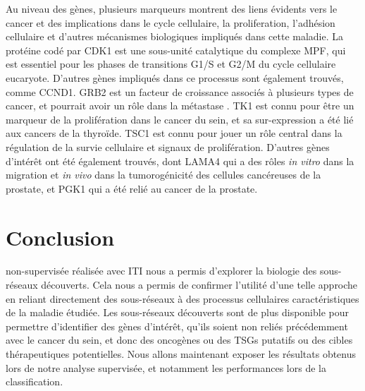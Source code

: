 		Au niveau des gènes, plusieurs marqueurs montrent des liens évidents vers le cancer et des implications dans le cycle cellulaire, la proliferation, l'adhésion cellulaire et d'autres mécanismes biologiques impliqués dans cette maladie.
		La protéine codé par \acs{CDK1} est une sous-unité catalytique du complexe \acs{MPF}, qui est essentiel pour les phases de transitions G1/S et G2/M du cycle cellulaire eucaryote.
		D'autres gènes impliqués dans ce processus sont également trouvés, comme \acs{CCND1}.
		\acs{GRB2} est un facteur de croissance associés à plusieurs types de cancer, et pourrait avoir un rôle dans la métastase \citet{Yu2008}.
		\acs{TK1} est connu pour être un marqueur de la prolifération dans le cancer du sein, et sa sur-expression a été lié aux cancers de la thyroïde.
		\acs{TSC1} est connu pour jouer un rôle central dans la régulation de la survie cellulaire et signaux de prolifération.
		D'autres gènes d'intérêt ont été également trouvés, dont \acs{LAMA4} qui a des rôles \emph{in vitro} dans la migration et \emph{in vivo} dans la tumorogénicité des cellules cancéreuses de la prostate, et \acs{PGK1} qui a été relié au cancer de la prostate.

\pagebreak

	\section{\textcolor{green!45!black}{{Conclusion}}}
		 non-supervisée réalisée avec ITI nous a permis d'explorer la biologie des sous-réseaux découverts.
		Cela nous a permis de confirmer l'utilité d'une telle approche en reliant directement des sous-réseaux à des processus cellulaires caractéristiques de la maladie étudiée.
		Les sous-réseaux découverts sont de plus disponible pour permettre d'identifier des gènes d'intérêt, qu'ils soient non reliés précédemment avec le cancer du sein, et donc des oncogènes ou des \acsp{TSG} putatifs ou des cibles thérapeutiques potentielles.
		Nous allons maintenant exposer les résultats obtenus lors de notre analyse supervisée, et notamment les performances lors de la classification.
		